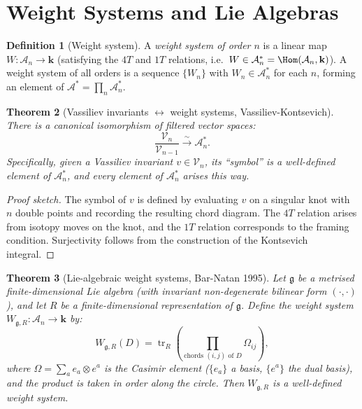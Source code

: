 \documentclass[12pt,a4paper]{amsart}
\newtheorem{theorem}{Theorem}[section]
\theoremstyle{definition}
\newtheorem{definition}[theorem]{Definition}
\newcommand{\Ac}{\mathcal{A}}
\DeclareMathOperator{\tr}{tr}
\begin{document}
\section{Weight Systems and Lie Algebras}\label{sec:weight}

\begin{definition}[Weight system]
A \emph{weight system of order $n$} is a linear map
$W: \Ac_n \to \mathbf{k}$ (satisfying the $4T$ and $1T$ relations, i.e.\
$W \in \Ac_n^* = \Hom(\Ac_n, \mathbf{k})$).  A weight system of all orders
is a sequence $\{W_n\}$ with $W_n \in \Ac_n^*$ for each $n$, forming an
element of $\Ac^* = \prod_n \Ac_n^*$.
\end{definition}

\begin{theorem}[Vassiliev invariants $\leftrightarrow$ weight systems,
Vassiliev-Kontsevich]\label{thm:vs_ws}
There is a canonical isomorphism of filtered vector spaces:
\[
  \frac{\mathcal{V}_n}{\mathcal{V}_{n-1}} \xrightarrow{\;\sim\;} \Ac_n^*.
\]
Specifically, given a Vassiliev invariant $v \in \mathcal{V}_n$, its
``symbol'' is a well-defined element of $\Ac_n^*$, and every element of
$\Ac_n^*$ arises this way.
\end{theorem}

\begin{proof}[Proof sketch]
The symbol of $v$ is defined by evaluating $v$ on a singular knot with
$n$ double points and recording the resulting chord diagram.  The $4T$
relation arises from isotopy moves on the knot, and the $1T$ relation
corresponds to the framing condition.  Surjectivity follows from the
construction of the Kontsevich integral.
\end{proof}

\begin{theorem}[Lie-algebraic weight systems, Bar-Natan 1995]
\label{thm:lie_ws}
Let $\mathfrak{g}$ be a metrised finite-dimensional Lie algebra (with
invariant non-degenerate bilinear form $(\cdot,\cdot)$), and let $R$ be
a finite-dimensional representation of $\mathfrak{g}$.  Define the
weight system $W_{\mathfrak{g},R}: \Ac_n \to \mathbf{k}$ by:
\[
  W_{\mathfrak{g},R}(D) = \tr_R\!\left(\prod_{\text{chords } (i,j) \text{ of } D}
  \Omega_{ij}\right),
\]
where $\Omega = \sum_a e_a \otimes e^a$ is the Casimir element ($\{e_a\}$
a basis, $\{e^a\}$ the dual basis), and the product is taken in order along
the circle.  Then $W_{\mathfrak{g},R}$ is a well-defined weight system.
\end{theorem}
\end{document}
